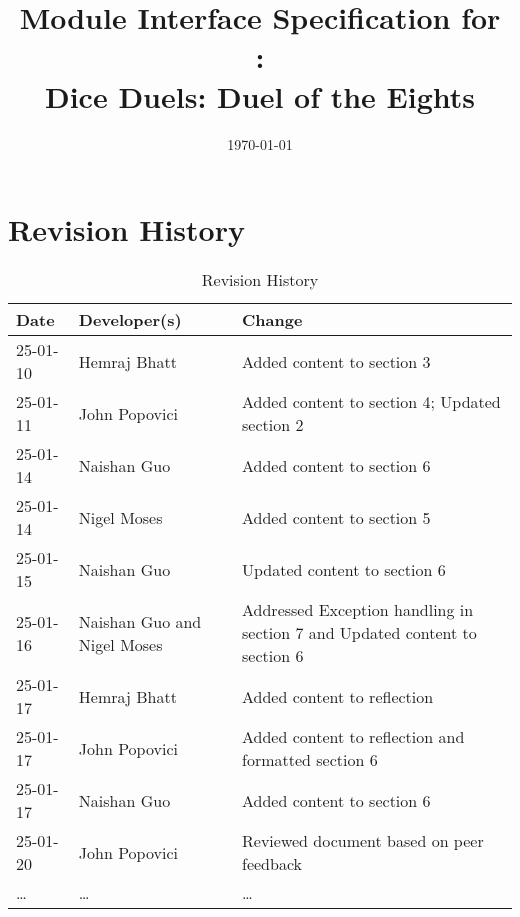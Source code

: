 \documentclass[12pt, titlepage]{article}
\begin{document}
\title{Module Interface Specification for\\\progname:\\Dice Duels: Duel of the Eights}

\author{\authname}

\date{\today}

\maketitle


\section{Revision History}

\begin{table}[hp]
\caption{Revision History} \label{TblRevisionHistory}
\begin{tabularx}{\textwidth}{llX}
\toprule
\textbf{Date} & \textbf{Developer(s)} & \textbf{Change}\\
\midrule
25-01-10 & Hemraj Bhatt & Added content to section 3\\
25-01-11 & John Popovici & Added content to section 4; Updated section 2\\
25-01-14 & Naishan Guo & Added content to section 6\\
25-01-14 & Nigel Moses & Added content to section 5\\
25-01-15 & Naishan Guo & Updated content to section 6\\
25-01-16 & Naishan Guo and Nigel Moses &  Addressed Exception handling in section 7 and Updated content to section 6 \\
25-01-17 & Hemraj Bhatt & Added content to reflection\\
25-01-17 & John Popovici & Added content to reflection and formatted section 6\\
25-01-17 & Naishan Guo & Added content to section 6\\
25-01-20 & John Popovici & Reviewed document based on peer feedback\\
\dots & \dots & \dots\\
\bottomrule
\end{tabularx}
\end{table}


\newpage

\tableofcontents

\newpage

\end{document}
